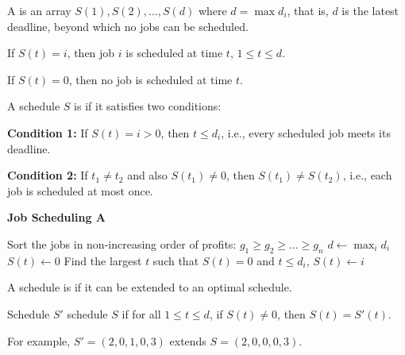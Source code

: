\begin{frame}
A 
is an array $S(1),S(2),\ldots,S(d)$ where $d=\max
d_i$, that is, $d$ is the latest deadline, beyond which no jobs can be
scheduled.  

If $S(t)=i$, then job $i$ is scheduled at time
$t$, $1\leq t\leq d$. 

If $S(t)=0$, then no job is scheduled at time
$t$.
\end{frame}

\begin{frame}
A schedule $S$ is 
if it satisfies two conditions: 

\noindent\textbf{Condition 1:}  If $S(t)=i>0$, then $t\leq
d_i$, i.e., every scheduled job meets its deadline. 

\noindent\textbf{Condition 2:}  If $t_1\neq t_2$ and also $S(t_1)\neq
0$, then $S(t_1)\neq S(t_2)$, i.e., each job is scheduled at most
once.  
\end{frame}

\begin{frame}
{\bf Job Scheduling A\fi}

\begin{algorithmic}[1]
\STATE Sort the jobs in non-increasing order of profits:
  $g_1\geq g_2\geq\ldots\geq g_n$ 
\STATE $d\longleftarrow\max_id_i$ 
     \STATE $S(t)\longleftarrow 0$ 
\ENDFOR
{} 
     \STATE Find the largest $t$ such that $S(t)=0$ and $t\leq d_i$,
            $S(t)\longleftarrow i$
\ENDFOR
\end{algorithmic}
\end{frame}

\begin{frame}
A schedule is  if it can be extended to an optimal
schedule.  

Schedule $S'$  schedule $S$ if for all $1\leq
t\leq d$, if $S(t)\neq 0$, then $S(t)=S'(t)$.  

For example,
$S'=(2,0,1,0,3)$ extends $S=(2,0,0,0,3)$.
\end{frame}

